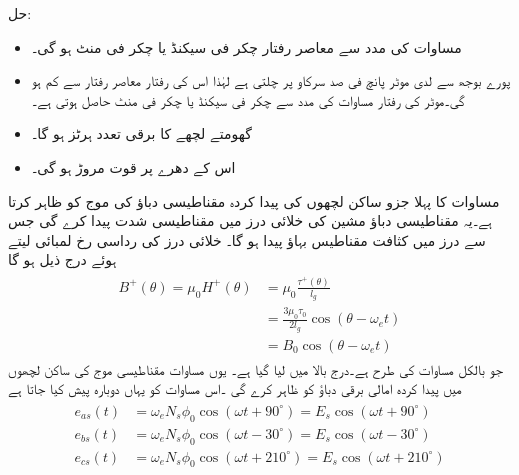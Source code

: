 حل:
\begin{itemize}
\item
مساوات   کی مدد سے معاصر رفتار  چکر فی سیکنڈ یا  چکر فی منٹ ہو گی۔
\item
پورے بوجھ سے لدی موٹر پانچ فی صد سرکاو پر چلتی ہے لہٰذا اس کی رفتار معاصر رفتار سے  کم ہو گی۔موٹر کی رفتار مساوات    کی مدد سے  چکر فی سیکنڈ یا  چکر فی منٹ حاصل ہوتی ہے۔
\item
گھومتے لچھے کا برقی تعدد   ہرٹز ہو گا۔
\item
اس کے دھرے پر قوت مروڑ  ہو گی۔
\end{itemize}
%
مساوات   کا پہلا جزو ساکن لچھوں کی پیدا کردہ مقناطیسی دباؤ کی موج  کو ظاہر کرتا ہے۔یہ مقناطیسی دباؤ مشین کی خلائی درز میں مقناطیسی شدت  پیدا کرے گی جس سے درز میں  کثافت مقناطیس بہاؤ  پیدا ہو گا۔ خلائی درز کی رداسی رخ  لمبائی  لیتے ہوئے درج ذیل ہو گا
\begin{gather}
\begin{aligned}\label{مساوات_امالی-سرک_تعلق_پ}
B^+(\theta)=\mu_0 H^+(\theta)&=\mu_0 \frac{\tau^+(\theta)}{l_g}\\
&=\frac{3 \mu_0 \tau_0}{2 l_g} \cos (\theta-\omega_e t)\\
&=B_0 \cos (\theta-\omega_e t)
\end{aligned}
\end{gather}
جو بالکل مساوات   کی طرح ہے۔درج بالا میں  لیا گیا ہے۔ یوں مساوات    مقناطیسی موج  کی ساکن لچھوں میں پیدا کردہ امالی برقی دباؤ کو ظاہر کرے گی ۔اس مساوات کو یہاں دوبارہ پیش کیا جاتا ہے
\begin{gather}
\begin{aligned}\label{مساوات_امالی_تین_دور_سائن_نما_برقی_دباو}
e_{as}(t)&=\omega_e N_s \phi_0 \cos (\omega t +90^{\circ})=E_s \cos (\omega t +90^{\circ})\\
e_{bs}(t)&=\omega_e N_s \phi_0 \cos (\omega t -30^{\circ})=E_s \cos (\omega t -30^{\circ})\\
e_{cs}(t)&=\omega_e N_s \phi_0 \cos (\omega t +210^{\circ})=E_s \cos (\omega t +210^{\circ})
\end{aligned}
\end{gather}
